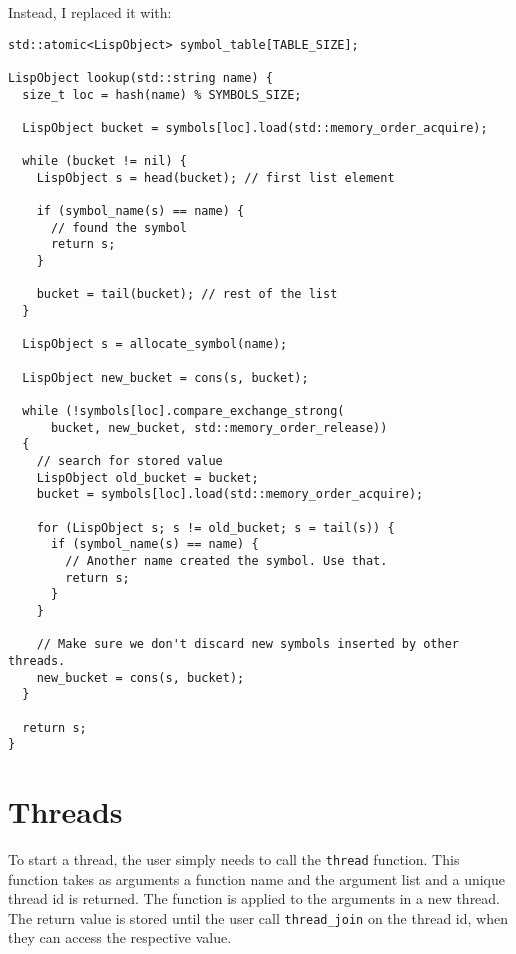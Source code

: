 Instead, I replaced it with:
\begin{verbatim}
std::atomic<LispObject> symbol_table[TABLE_SIZE];

LispObject lookup(std::string name) {
  size_t loc = hash(name) % SYMBOLS_SIZE;

  LispObject bucket = symbols[loc].load(std::memory_order_acquire);

  while (bucket != nil) {
    LispObject s = head(bucket); // first list element

    if (symbol_name(s) == name) {
      // found the symbol
      return s;
    }

    bucket = tail(bucket); // rest of the list
  }

  LispObject s = allocate_symbol(name);

  LispObject new_bucket = cons(s, bucket);

  while (!symbols[loc].compare_exchange_strong(
      bucket, new_bucket, std::memory_order_release))
  {
    // search for stored value
    LispObject old_bucket = bucket;
    bucket = symbols[loc].load(std::memory_order_acquire);

    for (LispObject s; s != old_bucket; s = tail(s)) {
      if (symbol_name(s) == name) {
        // Another name created the symbol. Use that.
        return s;
      }
    }

    // Make sure we don't discard new symbols inserted by other threads.
    new_bucket = cons(s, bucket);
  }

  return s;
}
\end{verbatim}


\section{Threads}
\label{sec:threads}

To start a thread, the user
simply needs to call the \texttt{thread} function. This function takes as arguments a function name and the argument list
and a unique thread id is returned. The function is applied to the arguments in a new thread. The return value
is stored until the user call \texttt{thread\_join} on the thread id, when they can access the respective value.


